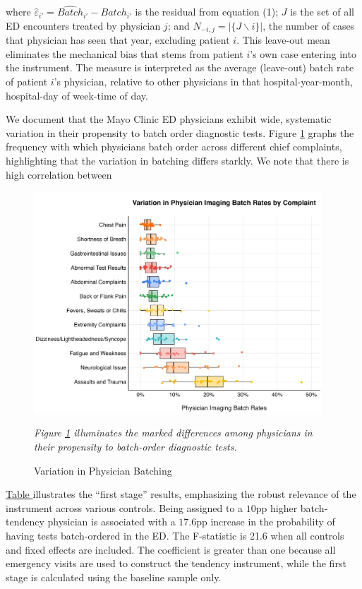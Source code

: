 \documentclass[,,nonblindrev]{informs}
\begin{document}
where \(\hat{\varepsilon}_{i'} = \hat{Batch}_{i'} - Batch_{i'}\) is the
residual from equation (1); \(J\) is the set of all ED encounters
treated by physician \(j\); and \(N_{-i,j} = |\{J \backslash i\}|\), the
number of cases that physician has seen that year, excluding patient
\(i\). This leave-out mean eliminates the mechanical bias that stems
from patient \(i\)'s own case entering into the instrument. The measure
is interpreted as the average (leave-out) batch rate of patient \(i\)'s
physician, relative to other physicians in that hospital-year-month,
hospital-day of week-time of day.

We document that the Mayo Clinic ED physicians exhibit wide, systematic
variation in their propensity to batch order diagnostic tests. Figure
\ref{fig:physician_batching} graphs the frequency with which physicians
batch order across different chief complaints, highlighting that the
variation in batching differs starkly. We note that there is high
correlation between

\begin{figure}[h]
  \centering
  \caption{Variation in Physician Batching}
  \label{fig:physician_batching}
  \includegraphics[width=4.25in]{../outputs/figures/Figure 1.png}
\begin{tablenotes}
\small
\item \textit{Figure \ref{fig:physician_batching} illuminates the marked differences among physicians in their propensity to batch-order diagnostic tests.}
\end{tablenotes}  
\end{figure}

\hyperref[table:first_stage]{Table } illustrates the ``first stage''
results, emphasizing the robust relevance of the instrument across
various controls. Being assigned to a \(10\)pp higher batch-tendency
physician is associated with a \(17.6\)pp increase in the probability of
having tests batch-ordered in the ED. The F-statistic is 21.6 when all
controls and fixed effects are included. The coefficient is greater than
one because all emergency visits are used to construct the tendency
instrument, while the first stage is calculated using the baseline
sample only.
\end{document}
